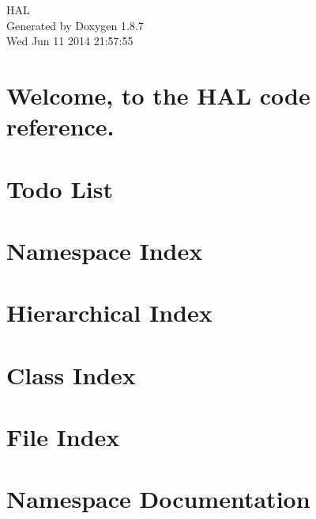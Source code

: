 \documentclass[twoside]{book}
\newcommand{\+}{\discretionary{\mbox{\scriptsize$\hookleftarrow$}}{}{}}
\newcommand{\clearemptydoublepage}{%
  \newpage{\pagestyle{empty}\cleardoublepage}%
}
\begin{document}
\hypersetup{pageanchor=false,
             bookmarks=true,
             bookmarksnumbered=true,
             pdfencoding=unicode
            }
\begin{titlepage}
\vspace*{7cm}
\begin{center}%
{\Large H\+A\+L }\\
\vspace*{1cm}
{\large Generated by Doxygen 1.8.7}\\
\vspace*{0.5cm}
{\small Wed Jun 11 2014 21:57:55}\\
\end{center}
\end{titlepage}
\clearemptydoublepage
\tableofcontents
\clearemptydoublepage
{}
\hypersetup{pageanchor=true}

\chapter{Welcome, to the H\+A\+L code reference.}
\label{index}\hypertarget{index}{}
\chapter{Todo List}
\label{todo}
\hypertarget{todo}{}

\chapter{Namespace Index}

\chapter{Hierarchical Index}

\chapter{Class Index}

\chapter{File Index}

\chapter{Namespace Documentation}

\end{document}
